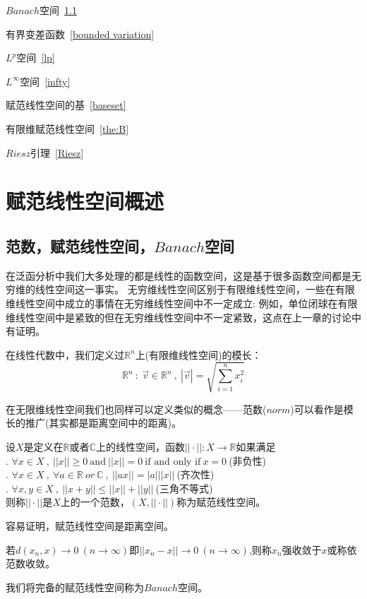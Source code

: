 \begin{introduction}
    \item $Banach$空间~\ref{Banach}
    \item 有界变差函数~\ref{bounded variation}
    \item $L^p$空间~\ref{lp}
    \item $L^{\infty}$空间~\ref{infty}
    \item 赋范线性空间的基~\ref{baseset}
    \item 有限维赋范线性空间~\ref{the:B}
    \item $Riesz$引理~\ref{Riesz}
  \end{introduction}
\section{赋范线性空间概述}
\subsection{范数，赋范线性空间，$Banach$空间} \label{Banach}
在泛函分析中我们大多处理的都是线性的函数空间，这是基于很多函数空间都是无穷维的线性空间这一事实。
无穷维线性空间区别于有限维线性空间，一些在有限维线性空间中成立的事情在无穷维线性空间中不一定成立:
例如，单位闭球在有限维线性空间中是紧致的但在无穷维线性空间中不一定紧致，这点在上一章的讨论中有证明。

在线性代数中，我们定义过$\mathbb{R}^n$上(有限维线性空间)的模长：
\[\mathbb{R}^n \ : \ \vec{v} \in \mathbb{R}^n \ , \ |\vec{v}|=\sqrt{\sum_{i=1}^nx_i^2}\]

在无限维线性空间我们也同样可以定义类似的概念——范数($norm$)可以看作是模长的推广(其实都是距离空间中的距离)。
\begin{definition}[范数]
    设$X$是定义在$\mathbb{R}$或者$\mathbb{C}$上的线性空间，函数$|| \cdot ||:X \to \mathbb{R}$如果满足\\
    . $\forall x \in X \ , \ ||x|| \geq 0 \ \text{and} \ ||x||=0 \ \text{if and only if} \ x=0 \ $(非负性)\\
    . $\forall x \in X \ , \ \forall a \in \mathbb{R} \ or \ \mathbb{C} \ , \ ||ax||=|a|||x|| \ $(齐次性)\\
    . $\forall x,y \in X \ , \ ||x+y|| \leq ||x||+||y|| \ $(三角不等式)\\
    则称$||\cdot||$是$X$上的一个范数，$(X,||\cdot||)$称为赋范线性空间。
\end{definition}
容易证明，赋范线性空间是距离空间。
\begin{definition}
    若$d(x_n,x) \to 0 \ (n \to \infty)$即$||x_n-x|| \to 0 \ (n \to \infty)$,则称$x_n$强收敛于$x$或称依范数收敛。
\end{definition}
我们将完备的赋范线性空间称为$Banach$空间。

